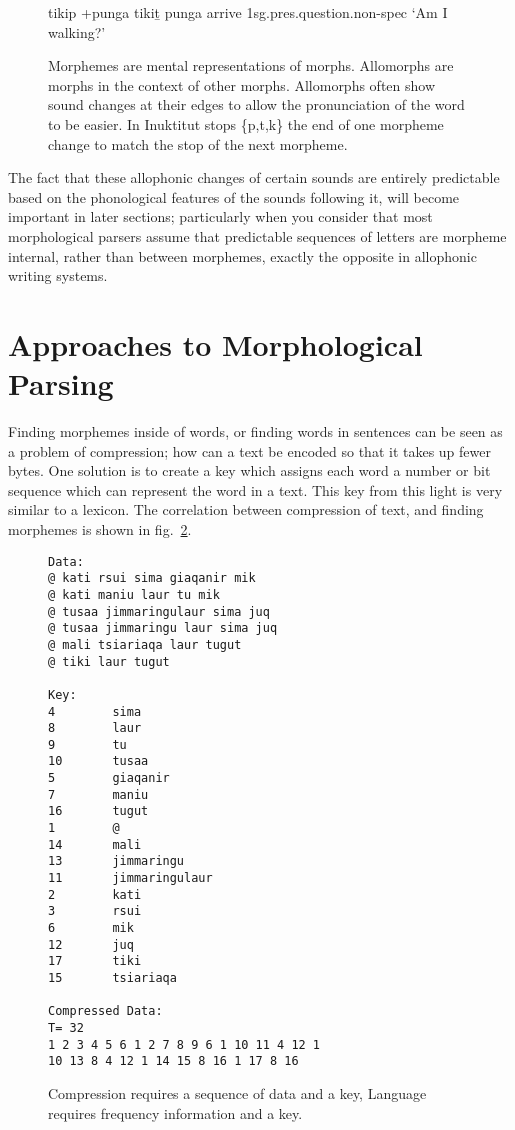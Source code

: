 \documentclass[runningheads,a4paper]{llncs}
\begin{document}
\begin{figure}[htb]
	\glll tikip +punga
	tiki{\b t}  punga
	arrive 1sg.pres.question.non-spec
	\glt `Am I walking?'
	\glend
	\caption{Morphemes are mental representations of morphs. Allomorphs are morphs in the context of other morphs. Allomorphs often show sound changes at their edges to allow the pronunciation of the word to be easier. In Inuktitut stops \{p,t,k\} the end of one morpheme change to match the stop of the next morpheme.}
	\label{fig:inuktitutallomorphy}
\end{figure}

The fact that these allophonic changes of certain sounds are entirely predictable based on the phonological features of the sounds following it, will become important in later sections; particularly when you consider that most morphological parsers assume that predictable sequences of letters are morpheme internal, rather than between morphemes, exactly the opposite in allophonic writing systems.



\section{Approaches to Morphological Parsing}
\label{approaches}
Finding morphemes inside of words, or finding words in sentences can be seen as a problem of compression;
 how can a text be encoded so that it takes up fewer bytes. One solution is to create a key which assigns each word a number or bit sequence which can represent the word in a  text. This key from this light is very similar to a lexicon. The correlation between compression of text, and finding morphemes is shown in fig.~\ref{fig:compression}.
 
 
\begin{figure}[htb]
\begin{verbatim}	
Data:
@ kati rsui sima giaqanir mik 
@ kati maniu laur tu mik 
@ tusaa jimmaringulaur sima juq 
@ tusaa jimmaringu laur sima juq 
@ mali tsiariaqa laur tugut 
@ tiki laur tugut 

Key:
4        sima
8        laur
9        tu
10       tusaa
5        giaqanir
7        maniu
16       tugut
1        @
14       mali
13       jimmaringu
11       jimmaringulaur
2        kati
3        rsui
6        mik
12       juq
17       tiki
15       tsiariaqa

Compressed Data:
T= 32
1 2 3 4 5 6 1 2 7 8 9 6 1 10 11 4 12 1 
10 13 8 4 12 1 14 15 8 16 1 17 8 16

\end{verbatim}
	
	
	\caption{Compression requires a sequence of data and a key, Language requires frequency information and a key.}
	\label{fig:compression}
\end{figure}
\end{document}
